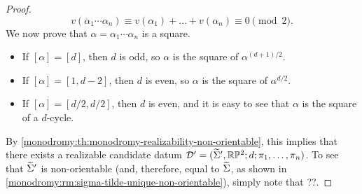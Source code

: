 \begin{proof}
\[
v(\alpha_1\cdots\alpha_n)\equiv v(\alpha_1)+\ldots+v(\alpha_n)\equiv 0\pmod{2}.
\]
We now prove that $\alpha=\alpha_1\cdots\alpha_n$ is a square.
\begin{itemize}
\item If $[\alpha]=[d]$, then $d$ is odd, so $\alpha$ is the square of $\alpha^{(d+1)/2}$.
\item If $[\alpha]=[1,d-2]$, then $d$ is even, so $\alpha$ is the square of $\alpha^{d/2}$.
\item If $[\alpha]=[d/2,d/2]$, then $d$ is even, and it is easy to see that $\alpha$ is the square of a $d$-cycle.
\end{itemize}
By \cref{monodromy:th:monodromy-realizability-non-orientable}, this implies that there exists a realizable candidate datum $\DD'=\datum{\tSigma',\RP[2]}{d}{\pi_1,\ldots,\pi_n}$. To see that $\widetilde{\Sigma}'$ is non-orientable (and, therefore, equal to $\widetilde{\Sigma}$, as shown in \cref{monodromy:rm:sigma-tilde-unique-non-orientable}), simply note that ??.
\end{proof}


